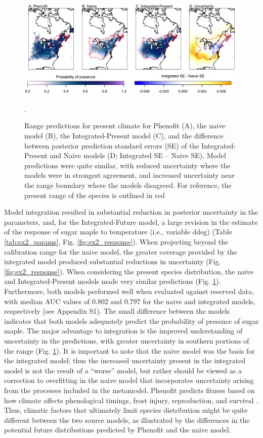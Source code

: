 \documentclass[11pt]{article}
\begin{document}
\begin{figure}[t]
\includegraphics[width=6.5in]{figs/ex2_pres_map.png}
\caption{Range predictions for present climate for Phenofit (A), the naive model (B), the Integrated-Present model (C), and the difference between posterior prediction standard errors (SE) of the Integrated-Present and Naive models (D; Integrated SE -- Naive SE).
Model predictions were quite similar, with reduced uncertainty where the models were in strongest agreement, and increased uncertainty near the range boundary where the models disagreed.
For reference, the present range of the species is outlined in red \citep{Little1971}}.
\label{fig:ex2_map_pres}
\end{figure}


Model integration resulted in substantial reduction in posterior uncertainty in the parameters, and, for the Integrated-Future model, a large revision in the estimate of the response of sugar maple to temperature (i.e., variable ddeg) (Table \ref{tab:ex2_params}, Fig. \ref{fig:ex2_response}).
When projecting beyond the calibration range for the naive model, the greater coverage provided by the integrated model produced substantial reductions in uncertainty (Fig. \ref{fig:ex2_response}).
When considering the present species distribution, the naive and Integrated-Present models made very similar predictions (Fig. \ref{fig:ex2_map_pres}).
Furthermore, both models performed well when evaluated against reserved data, with median AUC values of 0.802 and 0.797 for the naive and integrated models, respectively (see Appendix S1).
The small difference between the models indicates that both models adequately predict the probability of presence of sugar maple.
The major advantage to integration is the improved understanding of uncertainty in the predictions, with greater uncertainty in southern portions of the range (Fig. \ref{fig:ex2_map_pres}).
It is important to note that the naive model was the basis for the integrated model; thus the increased uncertainty present in the integrated model is not the result of a ``worse'' model, but rather should be viewed as a correction to overfitting in the naive model that incorporates uncertainty arising from the processes included in the metamodel.
Phenofit predicts fitness based on how climate affects phenological timings, frost injury, reproduction, and survival \citep{Chuine2001, Morin2009}.
Thus, climatic factors that ultimately limit species distribution might be quite different between the two source models, as illustrated by the differences in the potential future distributions predicted by Phenofit and the naive model.
\end{document}
